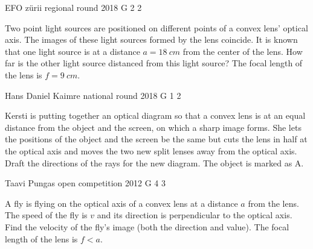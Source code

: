 \documentclass[11pt]{article}
\begin{document}
{EFO zürii} %
{regional round} %
{2018} %
{G 2} %
{2} %
{

\ifEngStatement
Two point light sources are positioned on different points of a convex lens’ optical axis. The images of these light sources formed by the lens coincide. It is known that one light source is at a distance $a=\SI{18}{cm}$ from the center of the lens. How far is the other light source distanced from this light source? The focal length of the lens is $f=\SI{9}{cm}$.
\fi
}

{Hans Daniel Kaimre} %
{national round} %
{2018} %
{G 1} %
{2} %
{

\ifEngStatement
Kersti is putting together an optical diagram so that a convex lens is at an equal distance from the object and the screen, on which a sharp image forms. She lets the positions of the object and the screen be the same but cuts the lens in half at the optical axis and moves the two new split lenses away from the optical axis. Draft the directions of the rays for the new diagram. The object is marked as A.
\begin{center}
\end{center}
\fi
}

{Taavi Pungas} %
{open competition} %
{2012} %
{G 4} %
{3} %
{

\ifEngStatement
A fly is flying on the optical axis of a convex lens at a distance $a$ from the lens. The speed of the fly is $v$ and its direction is perpendicular to the optical axis. Find the velocity of the fly’s image (both the direction and value). The focal length of the lens is $f < a$.
\fi
}
\end{document}
